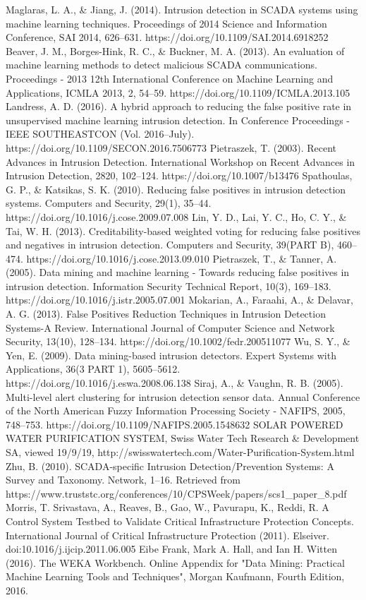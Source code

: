 \documentclass[letterpaper, 10 pt, conference]{ieeeconf}  %
\begin{document}
\begin{thebibliography}{99}
Maglaras, L. A., \& Jiang, J. (2014). Intrusion detection in SCADA systems using machine learning techniques. Proceedings of 2014 Science and Information Conference, SAI 2014, 626–631. https://doi.org/10.1109/SAI.2014.6918252
Beaver, J. M., Borges-Hink, R. C., \& Buckner, M. A. (2013). An evaluation of machine learning methods to detect malicious SCADA communications. Proceedings - 2013 12th International Conference on Machine Learning and Applications, ICMLA 2013, 2, 54–59. https://doi.org/10.1109/ICMLA.2013.105
Landress, A. D. (2016). A hybrid approach to reducing the false positive rate in unsupervised machine learning intrusion detection. In Conference Proceedings - IEEE SOUTHEASTCON (Vol. 2016–July). https://doi.org/10.1109/SECON.2016.7506773
Pietraszek, T. (2003). Recent Advances in Intrusion Detection. International Workshop on Recent Advances in Intrusion Detection, 2820, 102–124. https://doi.org/10.1007/b13476
Spathoulas, G. P., \& Katsikas, S. K. (2010). Reducing false positives in intrusion detection systems. Computers and Security, 29(1), 35–44. https://doi.org/10.1016/j.cose.2009.07.008
Lin, Y. D., Lai, Y. C., Ho, C. Y., \& Tai, W. H. (2013). Creditability-based weighted voting for reducing false positives and negatives in intrusion detection. Computers and Security, 39(PART B), 460–474. https://doi.org/10.1016/j.cose.2013.09.010
Pietraszek, T., \& Tanner, A. (2005). Data mining and machine learning - Towards reducing false positives in intrusion detection. Information Security Technical Report, 10(3), 169–183. https://doi.org/10.1016/j.istr.2005.07.001
Mokarian, A., Faraahi, A., \& Delavar, A. G. (2013). False Positives Reduction Techniques in Intrusion Detection Systems-A Review. International Journal of Computer Science and Network Security, 13(10), 128–134. https://doi.org/10.1002/fedr.200511077
Wu, S. Y., \& Yen, E. (2009). Data mining-based intrusion detectors. Expert Systems with Applications, 36(3 PART 1), 5605–5612. https://doi.org/10.1016/j.eswa.2008.06.138
Siraj, A., \& Vaughn, R. B. (2005). Multi-level alert clustering for intrusion detection sensor data. Annual Conference of the North American Fuzzy Information Processing Society - NAFIPS, 2005, 748–753. https://doi.org/10.1109/NAFIPS.2005.1548632
SOLAR POWERED WATER PURIFICATION SYSTEM, Swiss Water Tech Research \& Development SA, viewed 19/9/19, http://swisswatertech.com/Water-Purification-System.html
Zhu, B. (2010). SCADA-specific Intrusion Detection/Prevention Systems: A Survey and Taxonomy. Network, 1–16. Retrieved from https://www.truststc.org/conferences/10/CPSWeek/papers/scs1\_paper\_8.pdf
Morris, T. Srivastava, A., Reaves, B., Gao, W., Pavurapu, K., Reddi, R. A Control System Testbed to Validate Critical Infrastructure Protection Concepts. International Journal of Critical Infrastructure Protection (2011). Elseiver. doi:10.1016/j.ijcip.2011.06.005
Eibe Frank, Mark A. Hall, and Ian H. Witten (2016). The WEKA Workbench. Online Appendix for "Data Mining: Practical Machine Learning Tools and Techniques", Morgan Kaufmann, Fourth Edition, 2016.
\end{thebibliography}
\end{document}
